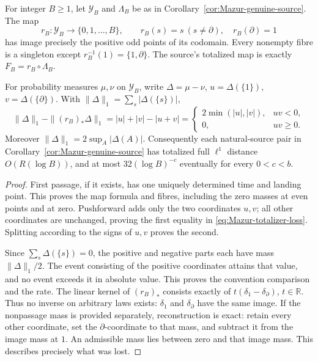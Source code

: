 \begin{proposition}
\label{prop:Mazur-totalizer-exact}
For integer \(B\ge1\), let \(\mathcal Y_B\) and \(\Lambda_B\) be as in
Corollary~\ref{cor:Mazur-genuine-source}. The map
\[
 r_B:\mathcal Y_B\longrightarrow\{0,1,\ldots,B\},\qquad
 r_B(s)=s\ (s\ne\partial),\quad r_B(\partial)=1
\]
has image precisely the positive odd points of its codomain. Every
nonempty fibre is a singleton except \(r_B^{-1}(1)=\{1,\partial\}\).
The source's totalized map is exactly \(F_B=r_B\circ\Lambda_B\).

For probability measures \(\mu,\nu\) on \(\mathcal Y_B\), write
\(\Delta=\mu-\nu\), \(u=\Delta(\{1\})\), \(v=\Delta(\{\partial\})\).
With \(\|\Delta\|_1=\sum_s|\Delta(\{s\})|\),
\begin{equation}
 \|\Delta\|_1-\|(r_B)_*\Delta\|_1
 =|u|+|v|-|u+v|
 =\begin{cases}2\min(|u|,|v|),&uv<0,\\0,&uv\ge0.\end{cases}
 \label{eq:Mazur-totalizer-loss}
\end{equation}
Moreover \(\|\Delta\|_1=2\sup_A|\Delta(A)|\).
Consequently each natural-source pair in
Corollary~\ref{cor:Mazur-genuine-source} has totalized full \(\ell^1\)
distance \(O(R(\log B))\), and at most \(32(\log B)^{-c}\)
eventually for every \(0<c<b\).
\end{proposition}
\begin{proof}
First passage, if it exists, has one uniquely determined time and
landing point. This proves the map formula and fibres, including the
zero masses at even points and at zero. Pushforward adds only the two
coordinates \(u,v\); all other coordinates are unchanged, proving
the first equality in \eqref{eq:Mazur-totalizer-loss}. Splitting
according to the signs of \(u,v\) proves the second.

Since \(\sum_s\Delta(\{s\})=0\), the positive and negative parts each
have mass \(\|\Delta\|_1/2\). The event consisting of the positive
coordinates attains that value, and no event exceeds it in absolute
value. This proves the convention comparison and the rate.
The linear kernel of \((r_B)_*\) consists exactly of
\(t(\delta_1-\delta_\partial)\), \(t\in\mathbb R\).
Thus no inverse on arbitrary laws exists: \(\delta_1\) and
\(\delta_\partial\) have the same image. If the nonpassage mass is
provided separately, reconstruction is exact: retain every other
coordinate, set the \(\partial\)-coordinate to that mass, and subtract
it from the image mass at \(1\). An admissible mass lies between zero
and that image mass. This describes precisely what was lost.
\end{proof}

